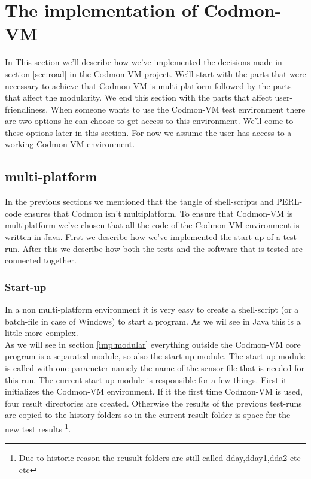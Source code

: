 \documentclass{article}
\newcommand{\project}{Codmon-VM}
\begin{document}
\newpage
\section{The implementation of \project{}}
\label{sec:Codmon2.0}
In This section we'll describe how we've implemented the decisions made in section \ref{sec:road} in the \project{} project. We'll start with the parts that were necessary to achieve that \project{} is multi-platform 
followed by the parts that affect the modularity. We end this section with the parts that affect user-friendliness. When someone wants to use the \project{} test environment there are two options he can choose 
to get access to this environment. We'll come to these options later in this section. For now we assume the user has access to a working \project{} environment.

\subsection{multi-platform}
\label{imp:multi}
In the previous sections we mentioned that the tangle of shell-scripts and PERL-code ensures that Codmon isn't multiplatform. To ensure that \project{} is multiplatform we've chosen that all the code of the 
\project{} environment is written in Java. First we describe how we've implemented the start-up of a test run. After this we describe how both the tests and the software that is tested are connected together.

\subsubsection{Start-up}
\label{imp:start}
In a non multi-platform environment it is very easy to create a shell-script (or a batch-file in case of Windows) to start a program. As we wil see in Java this is a little more complex.\\

\noindent As we will see in section \ref{imp:modular} everything outside the \project{} core program is a separated module, so also the start-up module. The start-up module is called with one parameter namely 
the name of the sensor file that is needed for this run. The current start-up module is responsible for a few things. First it initializes the \project{} environment. If it the first time \project{} is used, 
four result directories are created. Otherwise the results of the previous test-runs are copied to the history folders so in the current result folder is space for the new test results \footnote{Due to historic 
reason the reusult folders are still called dday,dday1,dda2 etc etc}.\\
\end{document}
